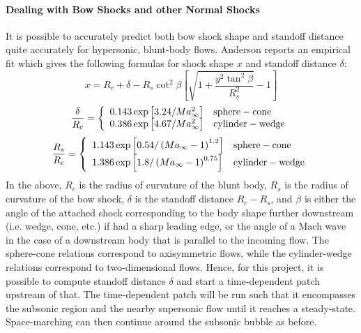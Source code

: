 \documentclass[12pt,letterpaper]{article}
\begin{document}
\paragraph{Dealing with Bow Shocks and other Normal Shocks}
It is possible to accurately predict both bow shock shape and standoff
distance quite accurately for hypersonic, blunt-body flows. Anderson
reports an empirical fit which gives the following formulas for shock
shape $x$ and standoff distance $\delta$\cite{anderson_hypersonic}:
\begin{equation}
x=R_c+\delta-R_s\cot^2\beta\left[\sqrt{1+\frac{y^2\tan^2\beta}{R_s^2}}-1\right]
\end{equation}
\begin{equation}
\frac{\delta}{R_c} = 
\left\{
\begin{array}{ll}
0.143 \exp{\left[3.24/Ma_\infty^2\right]}& {\rm sphere-cone}\\
0.386 \exp{\left[4.67/Ma_\infty^2\right]}& {\rm cylinder-wedge}
\end{array} 
\right.
\end{equation}
\begin{equation}
\frac{R_s}{R_c}=\left\{
\begin{array}{ll}
1.143\exp{\left[0.54/\left(Ma_\infty-1\right)^{1.2}\right]}& {\rm
    sphere-cone}\\
1.386\exp{\left[1.8/\left(Ma_\infty-1\right)^{0.75}\right]}& {\rm
      cylinder-wedge}
\end{array}
\right.
\end{equation}
In the above, $R_c$ is the radius of curvature of the blunt body, $R_s$
is the radius of curvature of the bow shock, $\delta$ is the standoff
distance $R_c-R_s$, and $\beta$ is either the angle of the attached
shock corresponding to the body shape further downstream (i.e. wedge,
cone, etc.) if had a sharp leading edge, or the angle of a Mach wave
in the case of a downstream body that is parallel to the incoming
flow. The sphere-cone relations correspond to axisymmetric flows,
while the cylinder-wedge relations correspond to two-dimensional
flows.
Hence, for this project, it is possible to compute standoff distance $\delta$ and
start a time-dependent patch upstream of that. The
time-dependent patch will be run such that it encompasses the subsonic
region and the nearby supersonic flow until it reaches a
steady-state. Space-marching can then continue around the subsonic
bubble as before. 
\end{document}
